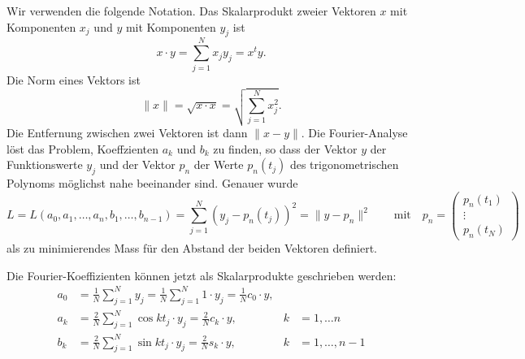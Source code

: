 Wir verwenden die folgende Notation.
Das Skalarprodukt zweier Vektoren $x$ mit Komponenten $x_j$ und $y$ mit
%
Komponenten $y_j$ ist
\begin{equation}
x\cdot y
=
\sum_{j=1}^N x_jy_j
=
x^ty.
\end{equation}
Die Norm eines Vektors ist
%
\begin{equation}
\| x\| = \!\sqrt{x\cdot x} = \!\sqrt{\sum_{j=1}^N x_j^2}.
\end{equation}
Die Entfernung zwischen zwei Vektoren ist dann $\| x-y\|$.
Die Fourier-Analyse löst das Problem, Koeffzienten $a_k$ und $b_k$
zu finden, so dass der Vektor $y$ der Funktionswerte $y_j$ und
der Vektor $p_n$ der Werte $p_n(t_j)$ des trigonometrischen Polynoms
möglichst nahe beeinander sind.
Genauer wurde 
\begin{equation}
L=L(a_0,a_1,\dots,a_n,b_1,\dots,b_{n-1})
=
\sum_{j=1}^N (y_j - p_n(t_j))^2
=
\| y - p_n\|^2
\qquad\text{mit}\quad
p_n=\begin{pmatrix}
p_n(t_1)\\\vdots\\p_n(t_N)
\end{pmatrix}
\end{equation}
als zu minimierendes Mass für den Abstand der beiden Vektoren
definiert.

Die Fourier-Koeffizienten können jetzt als Skalarprodukte geschrieben werden:
\begin{align*}
a_0
&=
\frac1N\sum_{j=1}^N y_j
=
\frac1N\sum_{j=1}^N 1\cdot y_j 
=
\frac1N c_0\cdot y,
\\
a_k
&=
\frac{2}{N}\sum_{j=1}^N
\cos kt_j \cdot y_j
=
\frac2N c_k\cdot y,
&k&=1,\dots n
\\
b_k
&=
\frac2N \sum_{j=1}^N \sin kt_j \cdot y_j
=
\frac2N s_k\cdot y,&k&=1,\dots,n-1
\end{align*}

